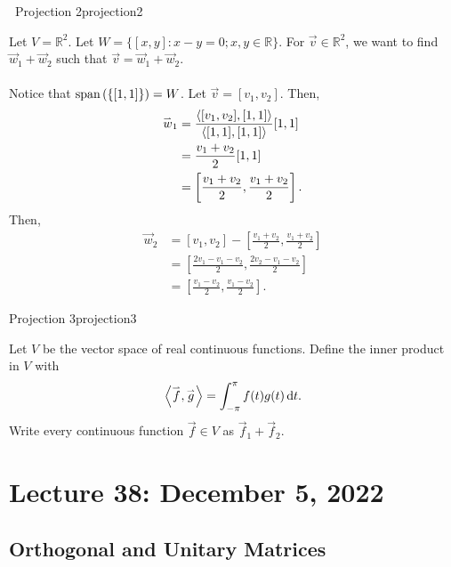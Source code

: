         \pagebreak
        \begin{example}{\Difficulty\,\Difficulty\,\,Projection 2}{projection2}

            Let \(V=\mathbb{R}^2\). Let \(W=\{[x,y]:x-y=0;x,y\in\mathbb{R}\}\). For \(\vec{v}\in\mathbb{R}^2\), we want to find \(\vec{w}_1+\vec{w}_2\) such that \(\vec{v}=\vec{w}_1+\vec{w}_2\).
            \\
            \\
            Notice that \(\text{span\,}(\{[1,1]\})=W\). Let \(\vec{v}=[v_1,v_2]\). Then,
            \begin{align*}
                \overset{_{\rightharpoonup}}{w}_1&=\frac{\left\langle [v_1,v_2],[1,1]\right\rangle}{\left\langle [1,1],[1,1]\right\rangle}[1,1] \\
                &=\frac{v_1+v_2}{2}[1,1] \\
                &=\left[\frac{v_1+v_2}{2},\frac{v_1+v_2}{2}\right].
            \end{align*}
            Then,
            \begin{align*}
                \vec{w}_2&=[v_1,v_2]-\left[\frac{v_1+v_2}{2},\frac{v_1+v_2}{2}\right] \\
                &=\left[\frac{2v_1-v_1-v_2}{2},\frac{2v_2-v_1-v_2}{2}\right] \\
                &=\left[\frac{v_1-v_2}{2},\frac{v_1-v_2}{2}\right].
            \end{align*}
            
        \end{example}
        \begin{example}{Projection 3}{projection3}

            Let \(V\) be the vector space of real continuous functions. Define the inner product in \(V\) with
            \begin{equation*}
                \left\langle \overset{_{\rightharpoonup}}{f},\overset{_{\rightharpoonup}}{g}\right\rangle=\int_{-\pi}^\pi f(t)g(t) \,\text{d} t.
            \end{equation*}
            Write every continuous function \(\vec{f}\in V\) as \(\vec{f}_1+\vec{f}_2\).
            
        \end{example}

\pagebreak

\section{Lecture 38: December 5, 2022}

    \subsection{Orthogonal and Unitary Matrices}


